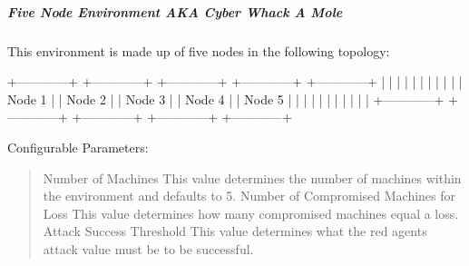\documentclass[letterpaper,10pt,english]{sphinxmanual}
\begin{document}
\subparagraph{Five Node Environment AKA Cyber Whack A Mole}
\label{\detokenize{source/yawning_titan.envs.specific:five-node-environment-aka-cyber-whack-a-mole}}
\sphinxAtStartPar
This environment is made up of five nodes in the following topology:

\sphinxAtStartPar
+————+  +————+  +————+  +————+  +————+
|            |  |            |  |            |  |            |  |            |
|  Node 1    |  |   Node 2   |  |    Node 3  |  |   Node 4   |  |   Node 5   |
|            |  |            |  |            |  |            |  |            |
+————+  +————+  +————+  +————+  +————+

\sphinxAtStartPar
Configurable Parameters:
\begin{quote}

\sphinxAtStartPar
Number of Machines \sphinxhyphen{} This value determines the number of machines within the environment and defaults to 5.
Number of Compromised Machines for Loss \sphinxhyphen{} This value determines how many compromised machines equal a loss.
Attack Success Threshold \sphinxhyphen{} This value determines what the red agents attack value must be to be successful.
\end{quote}
\end{document}
